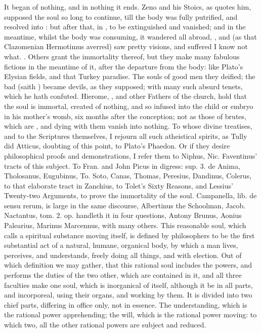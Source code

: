 {It began of nothing, and in nothing it ends. Zeno and his Stoics, as
\Austin{} quotes him, supposed the soul so long to continue, till
the body was fully putrified, and resolved into : but
after that, in , to be extinguished and vanished; and
in the meantime, whilst the body was consuming, it wandered all abroad,
, and (as that Clazomenian Hermotimus
averred) saw pretty visions, and suffered I know not what. .
Others grant the immortality thereof, but they make many fabulous
fictions in the meantime of it, after the departure from the body: like
Plato's Elysian fields, and that Turkey paradise. The souls of good men
they deified; the bad (saith \Austin{}) became devils, as they
supposed; with many such absurd tenets, which he hath confuted.
Hierome, \Austin{}, and other Fathers of the church, hold that the soul is
immortal, created of nothing, and so infused into the child or embryo
in his mother's womb, six months after the conception; not as
those of brutes, which are , and dying with them vanish into
nothing. To whose divine treatises, and to the Scriptures themselves, I
rejourn all such atheistical spirits, as Tully did Atticus, doubting of
this point, to Plato's Phaedon. Or if they desire philosophical proofs
and demonstrations, I refer them to Niphus, Nic. Faventinus' tracts of
this subject. To Fran. and John Picus in digress: sup. 3. de Anima,
Tholosanus, Eugubinus, To. Soto, Canas, Thomas, Peresius, Dandinus,
Colerus, to that elaborate tract in Zanchius, to Tolet's Sixty Reasons,
and Lessius' Twenty-two Arguments, to prove the immortality of the
soul. Campanella, lib. de sensu rerum, is large in the same discourse,
Albertinus the Schoolman, Jacob. Nactantus, tom. 2. op. handleth it in
four questions, Antony Brunus, Aonius Palearius, Marinus Marcennus,
with many others. This reasonable soul, which \Austin{} calls a spiritual
substance moving itself, is defined by philosophers to be the first
substantial act of a natural, humane, organical body, by which a man
lives, perceives, and understands, freely doing all things, and with
election. Out of which definition we may gather, that this rational
soul includes the powers, and performs the duties of the two other,
which are contained in it, and all three faculties make one soul, which
is inorganical of itself, although it be in all parts, and incorporeal,
using their organs, and working by them. It is divided into two chief
parts, differing in office only, not in essence. The understanding,
which is the rational power apprehending; the will, which is the
rational power moving: to which two, all the other rational powers are
subject and reduced.

}
